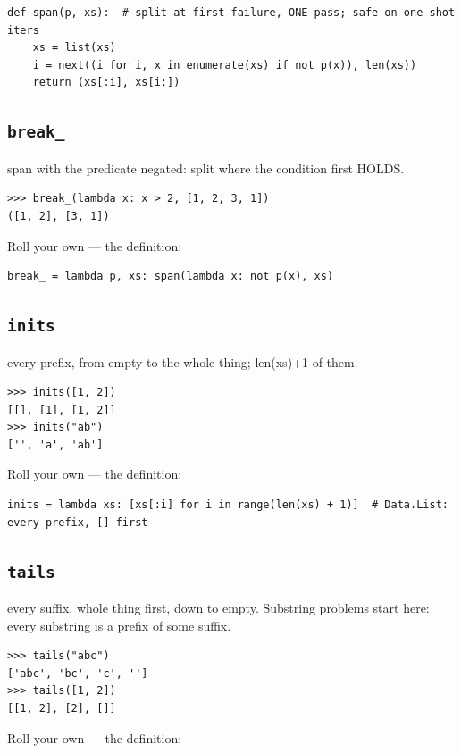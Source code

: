 \documentclass[10pt,letterpaper]{book}
\begin{document}
\begin{lstlisting}[style=ex]
def span(p, xs):  # split at first failure, ONE pass; safe on one-shot iters
    xs = list(xs)
    i = next((i for i, x in enumerate(xs) if not p(x)), len(xs))
    return (xs[:i], xs[i:])
\end{lstlisting}

\subsection{\texttt{break\_}}\label{def:break-}
span with the predicate negated: split where the condition first HOLDS.
\begin{lstlisting}[style=ex]
>>> break_(lambda x: x > 2, [1, 2, 3, 1])
([1, 2], [3, 1])
\end{lstlisting}

Roll your own --- the definition:

\begin{lstlisting}[style=ex]
break_ = lambda p, xs: span(lambda x: not p(x), xs)
\end{lstlisting}
\subsection{\texttt{inits}}\label{def:inits}
every prefix, from empty to the whole thing; len(xs)+1 of them.
\begin{lstlisting}[style=ex]
>>> inits([1, 2])
[[], [1], [1, 2]]
>>> inits("ab")
['', 'a', 'ab']
\end{lstlisting}

Roll your own --- the definition:

\begin{lstlisting}[style=ex]
inits = lambda xs: [xs[:i] for i in range(len(xs) + 1)]  # Data.List: every prefix, [] first
\end{lstlisting}
\subsection{\texttt{tails}}\label{def:tails}
every suffix, whole thing first, down to empty. Substring problems start here: every substring is a prefix of some suffix.
\begin{lstlisting}[style=ex]
>>> tails("abc")
['abc', 'bc', 'c', '']
>>> tails([1, 2])
[[1, 2], [2], []]
\end{lstlisting}

Roll your own --- the definition:
\end{document}
